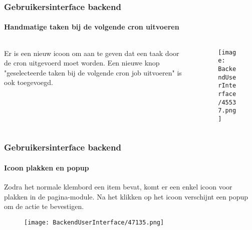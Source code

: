 \begin{frame}[fragile]
	\frametitle{Gebruikersinterface backend}
	\framesubtitle{Handmatige taken bij de volgende cron uitvoeren}

	\begin{columns}[T]
		\begin{column}{0.3\textwidth}
			Er is een nieuw icoon om aan te geven dat een taak door de cron uitgevoerd moet worden.
			Een nieuwe knop "geselecteerde taken bij de volgende cron job uitvoeren" is ook toegevoegd.
		\end{column}

		\begin{column}{0.7\textwidth}
			\begin{figure}\vspace{-0.6cm}
				\texttt{[image: BackendUserInterface/45537.png]}
			\end{figure}
		\end{column}
	\end{columns}

\end{frame}

\begin{frame}[fragile]
	\frametitle{Gebruikersinterface backend}
	\framesubtitle{Icoon plakken en popup}

	Zodra het normale klembord een item bevat, komt er een enkel icoon voor plakken in de
	pagina-module. Na het klikken op het icoon verschijnt een popup om de actie te bevestigen.

	\begin{figure}\vspace{-0.2cm}
		\texttt{[image: BackendUserInterface/47135.png]}
	\end{figure}

\end{frame}

